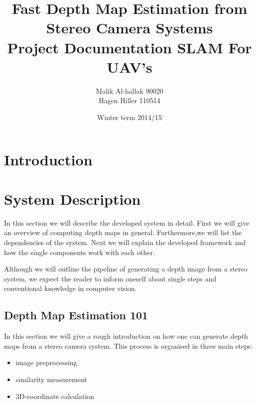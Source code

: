 \documentclass[11pt]{article}
\title{\textbf{Fast Depth Map Estimation from Stereo Camera Systems}\\Project Documentation SLAM For UAV's}
\author{Malik Al-hallak 90020\\
		Hagen Hiller 110514 }
\date{Winter term 2014/15}
\begin{document}
\maketitle



\section{Introduction}
\section{System Description}
In this section we will describe the developed system in detail. First we will give an overview of computing depth maps in general. Furthermore,we will list the dependencies of the system. Next we will explain the developed framework and how the single components work with each other.

Although we will outline the pipeline of generating a depth image from a stereo system, we expect the reader to inform oneself about single steps and conventional knowledge in computer vision.

\subsection{Depth Map Estimation 101}\label{sec:101}
In this section we will give a rough introduction on how one can generate depth maps from a stereo camera system. This process is organised in three main steps:
\begin{itemize}
	\item image preprocessing
	\item similarity measurement
	\item 3D-coordinate calculation
\end{itemize}
\end{document}
